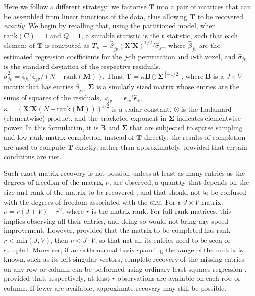 Here we follow a different strategy: we factorise $\mathbf{T}$ into a pair of matrices that can be assembled from linear functions of the data, thus allowing $\mathbf{T}$ to be recovered \emph{exactly}. We begin by recalling that, using the partitioned model, when $\text{rank}(\mathbf{C}) = 1$ and $Q = 1$, a suitable statistic is the $t$ statistic, such that each element of $\mathbf{T}$ is computed as $T_{jv} = \hat{\beta}_{jv}(\mathbf{X}'\mathbf{X})^{1/2}/\hat{\sigma}_{jv}$, where $\hat{\beta}_{jv}$ are the estimated regression coefficients for the $j$-th permutation and $v$-th voxel, and $\hat{\sigma}_{jv}$ is the standard deviation of the respective residuals, $\hat{\sigma}^2_{jv} = \boldsymbol{\hat{\epsilon}}_{jv}'\boldsymbol{\hat{\epsilon}}_{jv}/(N-\text{rank}(\mathbf{M}))$. Thus, $\mathbf{T} = \kappa \mathbf{B} \odot \boldsymbol{\Sigma}^{[-1/2]}$, where $\mathbf{B}$ is a $J \times V$ matrix that has entries $\hat{\beta}_{jv}$, $\boldsymbol{\Sigma}$ is a similarly sized matrix whose entries are the sums of squares of the residuals, $\varsigma_{jv} = \boldsymbol{\hat{\epsilon}}_{jv}'\boldsymbol{\hat{\epsilon}}_{jv}$, $\kappa = (\mathbf{X}'\mathbf{X}(N-\text{rank}(\mathbf{M})))^{1/2}$ is a scalar constant, $\odot$ is the Hadamard (elementwise) product, and the bracketed exponent in $\boldsymbol{\Sigma}$ indicates elementwise power. In this formulation, it is $\mathbf{B}$ and $\boldsymbol{\Sigma}$ that are subjected to sparse sampling and low rank matrix completion, instead of $\mathbf{T}$ directly; the results of completion are used to compute $\mathbf{T}$ exactly, rather than approximately, provided that certain conditions are met.

Such exact matrix recovery is not possible unless at least as many entries as the degrees of freedom of the matrix, $\nu$, are observed, a quantity that depends on the size and rank of the matrix to be recovered \citep{Candes2010}, and that should not to be confused with the degrees of freedom associated with the \textsc{glm}. For a $J \times V$ matrix, $\nu = r(J+V)-r^2$, where $r$ is the matrix rank. For full rank matrices, this implies observing all their entries, and doing so would not bring any speed improvement. However, provided that the matrix to be completed has rank $r<\text{min}(J,V)$, then $\nu < J \cdot V$, so that not all its entries need to be seen or sampled. Moreover, if an orthonormal basis spanning the range of the matrix is known, such as its left singular vectors, complete recovery of the missing entries on any row or column can be performed using ordinary least squares regression \citep{Troyanskaya2001}, provided that, respectively, at least $r$ observations are available on each row or column. If fewer are available, approximate recovery may still be possible.

